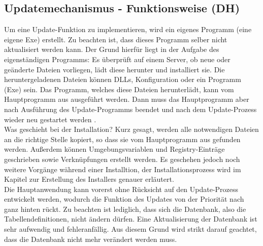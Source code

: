 \subsection{Updatemechanismus - Funktionsweise (DH)}
Um eine Update-Funktion zu implementieren, wird ein eigenes Programm (eine eigene Exe) erstellt. Zu beachten ist, dass dieses Programm selber nicht aktualisiert werden kann. Der Grund hierfür liegt in der Aufgabe des eigenständigen Programms: Es überprüft auf einem Server, ob neue oder geänderte Dateien vorliegen, lädt diese herunter und installiert sie. Die heruntergeladenen Dateien können DLLs, Konfiguration oder ein Programm (Exe) sein. Das Programm, welches diese Dateien herunterlädt, kann vom Hauptprogramm aus ausgeführt werden. Dann muss das Hauptprogramm aber nach Ausführung des Update-Programms beendet und nach dem Update-Prozess wieder neu gestartet werden \cite[vgl.][]{HOW_Update}.\\
Was geschieht bei der Installation? Kurz gesagt, werden alle notwendigen Dateien an die richtige Stelle kopiert, so dass sie vom Hauptprogramm aus gefunden werden. Außerdem können Umgebungsvariablen und Registry-Einträge geschrieben sowie Verknüpfungen erstellt werden. Es geschehen jedoch noch weitere Vorgänge während einer Installtion, der Installationsprozess wird im Kapitel zur Erstellung des Installers genauer erläutert.\\
Die Hauptanwendung kann vorerst ohne Rücksicht auf den Update-Prozess entwickelt werden, wodurch die Funktion des Updates von der Priorität nach ganz hinten rückt. Zu beachten ist lediglich, dass sich die Datenbank, also die Tabellendefinitionen, nicht ändern dürfen. Eine Aktualisierung der Datenbank ist sehr aufwendig und fehleranfällig. Aus diesem Grund wird strikt darauf geachtet, dass die Datenbank nicht mehr verändert werden muss.
\newpage